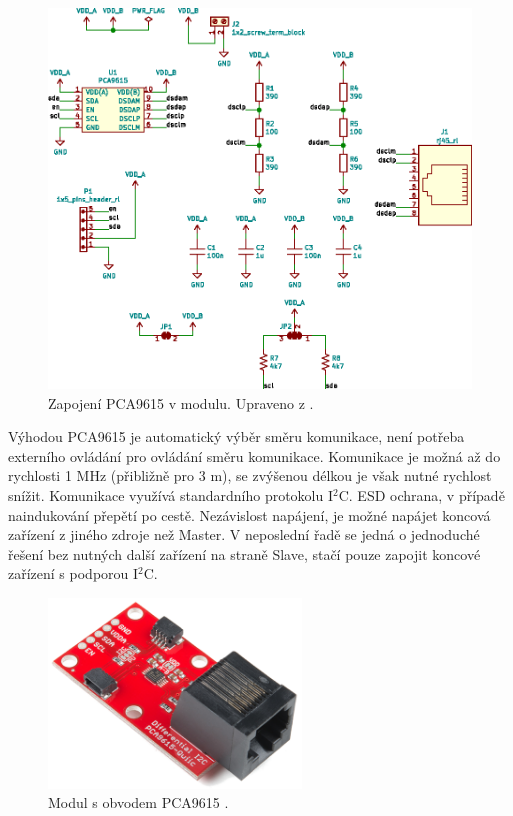 \begin{figure}[H]
    \centering
    \includegraphics[width=\textwidth]{images/svg/kicad/zapojeni-pca9615-i2c-sbernice.eps}
    \caption{Zapojení PCA9615 v modulu. Upraveno z \cite{pca9615-schema-zapojeni}.}
    \label{fig:zapojeni-pca9615-i2c-sbernice}
\end{figure}

Výhodou PCA9615 je automatický výběr směru komunikace, není potřeba externího ovládání pro ovládání směru komunikace. Komunikace je možná až do rychlosti 1 MHz (přibližně pro 3 m), se zvýšenou délkou je však nutné rychlost snížit. Komunikace využívá standardního protokolu I$^2$C. ESD ochrana, v případě naindukování přepětí po cestě. Nezávislost napájení, je možné napájet koncová zařízení z jiného zdroje než Master. V neposlední řadě se jedná o jednoduché řešení bez nutných další zařízení na straně Slave, stačí pouze zapojit koncové zařízení s podporou I$^2$C.

\begin{figure}[H]
    \centering
    \includegraphics[width=0.6\textwidth]{images/modul-pca9615-i2c-sbernice.png}
    \caption[Modul s obvodem PCA9615.]{Modul s obvodem PCA9615 \cite{pca9615-i2c-modul}.}
    \label{fig:modul-pca9615-i2c-sbernice}
\end{figure}

